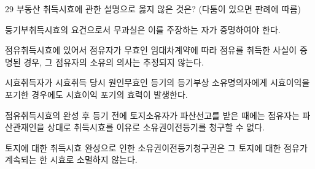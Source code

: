\begin{question}{29}
부동산 취득시효에 관한 설명으로 옳지 않은 것은? (다툼이 있으면 판례에 따름)
\begin{choices}
  \item 등기부취득시효의 요건으로서 무과실은 이를 주장하는 자가 증명하여야 한다.
  \item 점유취득시효에 있어서 점유자가 무효인 임대차계약에 따라 점유를 취득한 사실이 증명된 경우, 그 점유자의 소유의 의사는 추정되지 않는다.
  \item 시효취득자가 시효취득 당시 원인무효인 등기의 등기부상 소유명의자에게 시효이익을 포기한 경우에도 시효이익 포기의 효력이 발생한다.
  \item 점유취득시효의 완성 후 등기 전에 토지소유자가 파산선고를 받은 때에는 점유자는 파산관재인을 상대로 취득시효를 이유로 소유권이전등기를 청구할 수 없다.
  \item 토지에 대한 취득시효 완성으로 인한 소유권이전등기청구권은 그 토지에 대한 점유가 계속되는 한 시효로 소멸하지 않는다.
\end{choices}
\end{question}

